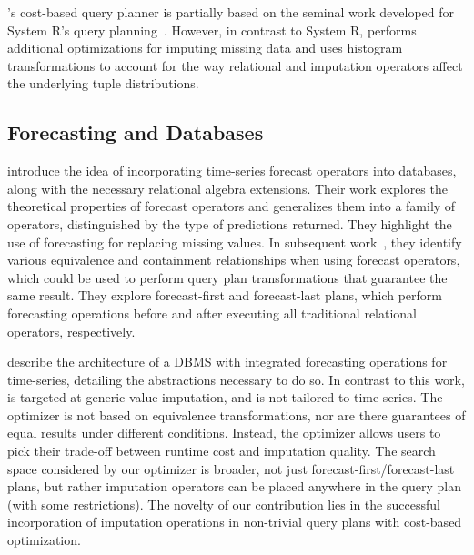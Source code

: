 \ProjectName's cost-based query planner 
is partially based on the seminal work developed for System R's query planning~\cite{blasgen1981system}.
However, in contrast to System R, \ProjectName{} performs additional optimizations for imputing missing data and
uses histogram transformations to account for the way relational and imputation operators affect the underlying
tuple distributions.


\subsection{Forecasting and Databases}
\textcite*{parisi2011embedding} introduce the idea of incorporating time-series forecast operators into
databases, along with the necessary relational algebra extensions. Their work explores the theoretical
properties of forecast operators and generalizes them into a family of operators, distinguished by
the type of predictions returned. They highlight the use of forecasting for replacing missing values.
In subsequent work~\cite{parisi2013temporal}, they identify various equivalence and containment
relationships when using forecast operators, which could be used to perform query plan transformations that guarantee the same result. They
explore forecast-first and forecast-last plans, which perform forecasting operations before and after executing all traditional
relational operators, respectively. 

\textcite*{fischer2013towards} describe the architecture of a DBMS with integrated forecasting operations for time-series, detailing
the abstractions necessary to do so.
In contrast to this work, \ProjectName{} is targeted at generic value imputation, and is not tailored to time-series.
The optimizer is not based on equivalence transformations, nor are there guarantees of equal
results under different conditions. Instead, the optimizer allows users to pick their trade-off between
runtime cost and imputation quality. The search space considered by our optimizer is broader, not just
forecast-first/forecast-last plans, but rather imputation operators can be placed anywhere in the query plan
(with some restrictions). The novelty of our contribution lies in the successful incorporation of
imputation operations in non-trivial query plans with cost-based optimization.

